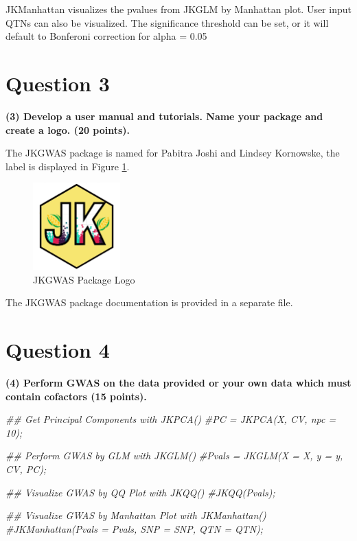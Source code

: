 \documentclass[
]{article}
\newenvironment{Shaded}{\begin{snugshade}}{\end{snugshade}}
\newcommand{\CommentTok}[1]{\textcolor[rgb]{0.56,0.35,0.01}{\textit{#1}}}
\begin{document}
\par

\textbullet JKManhattan visualizes the pvalues from JKGLM by Manhattan
plot. User input QTNs can also be visualized. The significance threshold
can be set, or it will default to Bonferoni correction for alpha = 0.05

\par

\hypertarget{question-3}{%
\section{Question 3}\label{question-3}}

\textbf{(3) Develop a user manual and tutorials. Name your package and create a logo. (20 points).}

The JKGWAS package is named for Pabitra Joshi and Lindsey Kornowske, the
label is displayed in Figure \ref{fig:logo}.

\begin{figure}[htbp]
\begin{center}
\includegraphics[width = 0.3\textwidth]{JKGWAS_logo.png}
  \caption{JKGWAS Package Logo}
  \label{fig:logo}
\end{center}
\end{figure}

The JKGWAS package documentation is provided in a separate file.

\hypertarget{question-4}{%
\section{Question 4}\label{question-4}}

\textbf{(4) Perform GWAS on the data provided or your own data which must contain cofactors (15 points).}

\begin{Shaded}
\begin{Highlighting}[]
\CommentTok{\#\# Get Principal Components with JKPCA()}
\CommentTok{\#PC = JKPCA(X, CV, npc = 10);}

\CommentTok{\#\# Perform GWAS by GLM with JKGLM()}
\CommentTok{\#Pvals = JKGLM(X = X, y = y, CV, PC);}

\CommentTok{\#\# Visualize GWAS by QQ Plot with JKQQ()}
\CommentTok{\#JKQQ(Pvals);}

\CommentTok{\#\# Visualize GWAS by Manhattan Plot with JKManhattan()}
\CommentTok{\#JKManhattan(Pvals = Pvals, SNP = SNP, QTN = QTN);}
\end{Highlighting}
\end{Shaded}
\end{document}
